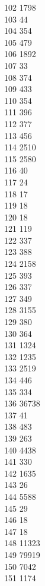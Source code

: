 { 102	1798 \\
 103	44 \\
 104	354 \\
 105	479 \\
 106	1892 \\
 107	33 \\
 108	374 \\
 109	433 \\
 110	354 \\
 111	396 \\
 112	377 \\
 113	456 \\
 114	2510 \\
 115	2580 \\
 116	40 \\
 117	24 \\
 118	17 \\
 119	18 \\
 120	18 \\
 121	119 \\
 122	337 \\
 123	388 \\
 124	2158 \\
 125	393 \\
 126	337 \\
 127	349 \\
 128	3155 \\
 129	380 \\
 130	364 \\
 131	1324 \\
 132	1235 \\
 133	2519 \\
 134	446 \\
 135	334 \\
 136	36738 \\
 137	41 \\
 138	483 \\
 139	263 \\
 140	4438 \\
 141	330 \\
 142	1635 \\
 143	26 \\
 144	5588 \\
 145	29 \\
 146	18 \\
 147	18 \\
 148	11323 \\
 149	79919 \\
 150	7042 \\
 151	1174 \\
}
